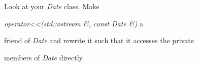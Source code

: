 Look at your \textit{Date} class. Make

\textit{operator<<(std::ostream \&, const Date \&)} a

friend of \textit{Date} and rewrite it such that it accesses the private

members of \textit{Date} directly.

